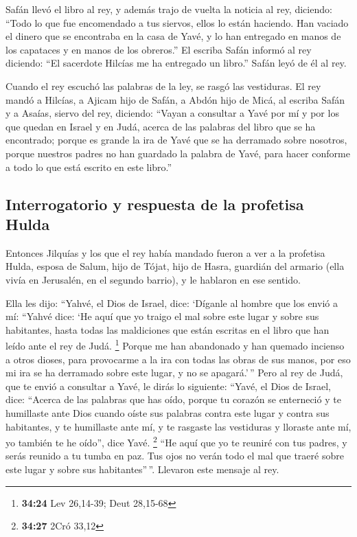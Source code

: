  Safán llevó el libro al rey, y además trajo de vuelta la
noticia al rey, diciendo: ``Todo lo que fue encomendado a tus siervos,
ellos lo están haciendo.  Han vaciado el dinero que se
encontraba en la casa de Yavé, y lo han entregado en manos de los
capataces y en manos de los obreros.''  El escriba Safán
informó al rey diciendo: ``El sacerdote Hilcías me ha entregado un
libro.'' Safán leyó de él al rey.

 Cuando el rey escuchó las palabras de la ley, se rasgó
las vestiduras.  El rey mandó a Hilcías, a Ajicam hijo de
Safán, a Abdón hijo de Micá, al escriba Safán y a Asaías, siervo del
rey, diciendo:  ``Vayan a consultar a Yavé por mí y por
los que quedan en Israel y en Judá, acerca de las palabras del libro que
se ha encontrado; porque es grande la ira de Yavé que se ha derramado
sobre nosotros, porque nuestros padres no han guardado la palabra de
Yavé, para hacer conforme a todo lo que está escrito en este libro.''

\hypertarget{interrogatorio-y-respuesta-de-la-profetisa-hulda}{%
\subsection{Interrogatorio y respuesta de la profetisa
Hulda}\label{interrogatorio-y-respuesta-de-la-profetisa-hulda}}

 Entonces Jilquías y los que el rey había mandado fueron
a ver a la profetisa Hulda, esposa de Salum, hijo de Tójat, hijo de
Hasra, guardián del armario (ella vivía en Jerusalén, en el segundo
barrio), y le hablaron en ese sentido.

 Ella les dijo: ``Yahvé, el Dios de Israel, dice:
`Díganle al hombre que los envió a mí:  ``Yahvé dice: `He
aquí que yo traigo el mal sobre este lugar y sobre sus habitantes, hasta
todas las maldiciones que están escritas en el libro que han leído ante
el rey de Judá. \footnote{\textbf{34:24} Lev 26,14-39; Deut 28,15-68}
 Porque me han abandonado y han quemado incienso a otros
dioses, para provocarme a la ira con todas las obras de sus manos, por
eso mi ira se ha derramado sobre este lugar, y no se apagará.'\,''
 Pero al rey de Judá, que te envió a consultar a Yavé, le
dirás lo siguiente: ``Yavé, el Dios de Israel, dice: ``Acerca de las
palabras que has oído,  porque tu corazón se enterneció y
te humillaste ante Dios cuando oíste sus palabras contra este lugar y
contra sus habitantes, y te humillaste ante mí, y te rasgaste las
vestiduras y lloraste ante mí, yo también te he oído'', dice Yavé.
\footnote{\textbf{34:27} 2Cró 33,12}  ``He aquí que yo te
reuniré con tus padres, y serás reunido a tu tumba en paz. Tus ojos no
verán todo el mal que traeré sobre este lugar y sobre sus
habitantes''\,''. Llevaron este mensaje al rey.

